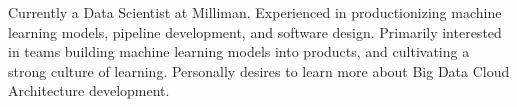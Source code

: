 

\begin{cvparagraph}

Currently a Data Scientist at Milliman. Experienced in productionizing machine learning models, pipeline development, and software design. Primarily interested in teams building machine learning models into products, and cultivating a strong culture of learning. Personally desires to learn more about Big Data Cloud Architecture development.
\end{cvparagraph}
